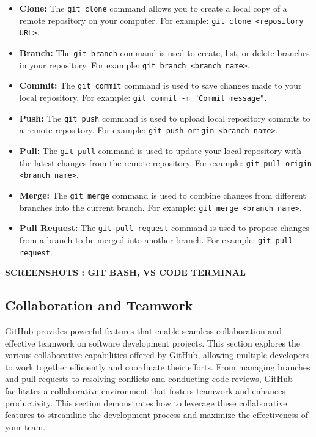 \medskip \begin{itemize}
    \item \textbf{Clone:} The \texttt{git clone} command allows you to create a local copy of a remote repository on your computer. For example: \texttt{git clone <repository URL>}.
  
    \item \textbf{Branch:} The \texttt{git branch} command is used to create, list, or delete branches in your repository. For example: \texttt{git branch <branch name>}.
  
    \item \textbf{Commit:} The \texttt{git commit} command is used to save changes made to your local repository. For example: \texttt{git commit -m "Commit message"}.
  
    \item \textbf{Push:} The \texttt{git push} command is used to upload local repository commits to a remote repository. For example: \texttt{git push origin <branch name>}.
  
    \item \textbf{Pull:} The \texttt{git pull} command is used to update your local repository with the latest changes from the remote repository. For example: \texttt{git pull origin <branch name>}.
  
    \item \textbf{Merge:} The \texttt{git merge} command is used to combine changes from different branches into the current branch. For example: \texttt{git merge <branch name>}.
  
    \item \textbf{Pull Request:} The \texttt{git pull request} command is used to propose changes from a branch to be merged into another branch. For example: \texttt{git pull request}.
  \end{itemize}
  \medskip \textbf{SCREENSHOTS : GIT BASH, VS CODE TERMINAL }

  \subsection{Collaboration and Teamwork}
GitHub provides powerful features that enable seamless collaboration and effective teamwork on software development projects. This section explores the various collaborative capabilities offered by GitHub, allowing multiple developers to work together efficiently and coordinate their efforts. From managing branches and pull requests to resolving conflicts and conducting code reviews, GitHub facilitates a collaborative environment that fosters teamwork and enhances productivity. This section demonstrates how to leverage these collaborative features to streamline the development process and maximize the effectiveness of your team.   

